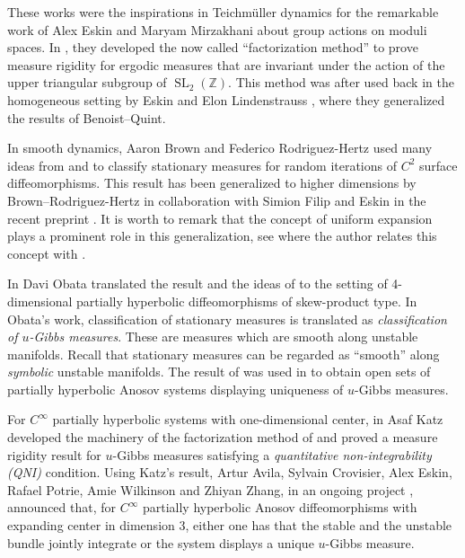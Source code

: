 \documentclass[a4paper,11pt,reqno]{amsart}
\newcommand{\Z}{{\mathbb Z}}
\theoremstyle{definition}
\begin{document}
These works were the inspirations in Teichmüller dynamics for the remarkable work of Alex Eskin and Maryam Mirzakhani \cite{EskinMirzakhani} about group actions on moduli spaces. In \cite{EskinMirzakhani}, they developed the now called ``factorization method'' to prove measure rigidity for ergodic measures that are invariant under the action of the upper triangular subgroup of $\operatorname{SL}_2(\Z)$. This method was after used back in the homogeneous setting by Eskin and Elon Lindenstrauss \cite{EskinLind}, where they generalized the results of Benoist--Quint.

In smooth dynamics, Aaron Brown and Federico Rodriguez-Hertz \cite{BRH} used many ideas from \cite{EskinMirzakhani} and \cite{BenoistQuintI} to classify stationary measures for random iterations of $C^2$ surface diffeomorphisms. This result has been generalized to higher dimensions by Brown--Rodriguez-Hertz in collaboration with Simion Filip and Eskin in the recent preprint \cite{befh}. It is worth to remark that the concept of uniform expansion plays a prominent role in this generalization, see \cite{chung} where the author relates this concept with \cite{BRH}.

In \cite{Obata} Davi Obata translated the result and the ideas of \cite{BRH} to the setting of 4-dimensional partially hyperbolic diffeomorphisms of skew-product type. In Obata's work, classification of stationary measures is translated as \emph{classification of $u$-Gibbs measures}. These are measures which are smooth along unstable manifolds. Recall that stationary measures can be regarded as ``smooth'' along \emph{symbolic} unstable manifolds. The result of \cite{Obata} was used in \cite{CPO} to obtain open sets of partially hyperbolic Anosov systems displaying uniqueness of $u$-Gibbs measures. 

For $C^{\infty}$ partially hyperbolic systems with one-dimensional center, in \cite{Katz} Asaf Katz developed the machinery of the factorization method of \cite{EskinMirzakhani} and proved a measure rigidity result for $u$-Gibbs measures satisfying a \emph{quantitative non-integrability (QNI)} condition. Using Katz's result, Artur Avila, Sylvain Crovisier, Alex Eskin, Rafael Potrie, Amie Wilkinson and Zhiyan Zhang, in an ongoing project \cite{ACEPWZ}, announced that, for $C^{\infty}$ partially hyperbolic Anosov diffeomorphisms with expanding center in dimension 3, either one has that the stable and the unstable bundle jointly integrate or the system displays a unique $u$-Gibbs measure.  
\end{document}
